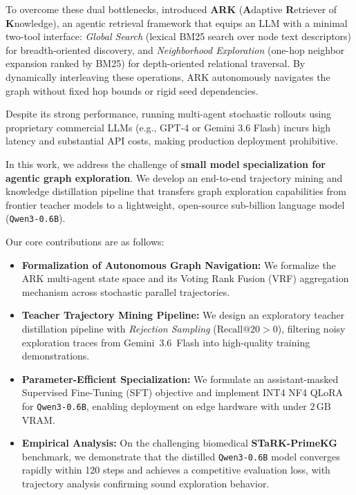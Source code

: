 \documentclass[11pt]{article}
\begin{document}
To overcome these dual bottlenecks, \citet{polonuer2026ark} introduced \textbf{ARK} (\textbf{A}daptive \textbf{R}etriever of \textbf{K}nowledge), an agentic retrieval framework that equips an LLM with a minimal two-tool interface: \textit{Global Search} (lexical BM25 search over node text descriptors) for breadth-oriented discovery, and \textit{Neighborhood Exploration} (one-hop neighbor expansion ranked by BM25) for depth-oriented relational traversal. By dynamically interleaving these operations, ARK autonomously navigates the graph without fixed hop bounds or rigid seed dependencies.

Despite its strong performance, running multi-agent stochastic rollouts using proprietary commercial LLMs (e.g., GPT-4 or Gemini 3.6 Flash) incurs high latency and substantial API costs, making production deployment prohibitive.

In this work, we address the challenge of \textbf{small model specialization for agentic graph exploration}. We develop an end-to-end trajectory mining and knowledge distillation pipeline that transfers graph exploration capabilities from frontier teacher models to a lightweight, open-source sub-billion language model (\texttt{Qwen3-0.6B}).

Our core contributions are as follows:
\begin{itemize}[leftmargin=*]
    \item \textbf{Formalization of Autonomous Graph Navigation:} We formalize the ARK multi-agent state space and its Voting Rank Fusion (VRF) aggregation mechanism across stochastic parallel trajectories.
    \item \textbf{Teacher Trajectory Mining Pipeline:} We design an exploratory teacher distillation pipeline with \textit{Rejection Sampling} ($\text{Recall@20} > 0$), filtering noisy exploration traces from Gemini~3.6~Flash into high-quality training demonstrations.
    \item \textbf{Parameter-Efficient Specialization:} We formulate an assistant-masked Supervised Fine-Tuning (SFT) objective and implement INT4 NF4 QLoRA for \texttt{Qwen3-0.6B}, enabling deployment on edge hardware with under $2\,\text{GB}$ VRAM.
    \item \textbf{Empirical Analysis:} On the challenging biomedical \textbf{STaRK-PrimeKG} benchmark, we demonstrate that the distilled \texttt{Qwen3-0.6B} model converges rapidly within 120 steps and achieves a competitive evaluation loss, with trajectory analysis confirming sound exploration behavior.
\end{itemize}
\end{document}
